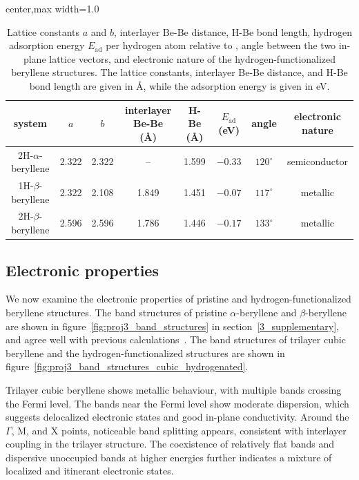 \begin{table}[!htbp]
\centering
{}
\begin{adjustbox}{center,max width=1.0\linewidth}
\begin{tabular}{cccccccc}
\hline
\rowcolor{gray!25}
system
& $a$
& $b$
& interlayer Be-Be (\AA)
& H-Be (\AA)
& $E_{\mathrm{ad}}$ (eV)
& angle
& electronic nature \\
\hline
2H-$\alpha$-beryllene
& 2.322 & 2.322 & -- & 1.599 & $-0.33$ & $120^{\circ}$ & semiconductor \\
1H-$\beta$-beryllene
& 2.322 & 2.108 & 1.849 & 1.451 & $-0.07$ & $117^{\circ}$ & metallic \\
2H-$\beta$-beryllene
& 2.596 & 2.596 & 1.786 & 1.446 & $-0.17$ & $133^{\circ}$ & metallic \\
\hline
\end{tabular}
\end{adjustbox}
\caption{Lattice constants $a$ and $b$,
interlayer Be-Be distance, H-Be bond length,
hydrogen adsorption energy $E_{\mathrm{ad}}$ per hydrogen atom relative to ,
angle between the two in-plane lattice vectors,
and electronic nature of the hydrogen-functionalized beryllene structures.
The lattice constants, interlayer Be-Be distance,
and H-Be bond length are given in \si{\angstrom},
while the adsorption energy is given in \si{\electronvolt}.}
\label{tab:proj3_hydrogenated_structural_parameters}
\end{table}

\subsection{Electronic properties}
\label{3_electronic_properties}

We now examine the electronic properties of pristine and hydrogen-functionalized beryllene structures.
The band structures of pristine $\alpha$-beryllene and $\beta$-beryllene are shown in figure~\ref{fig:proj3_band_structures} in section~\ref{3_supplementary},
and agree well with previous calculations~\cite{li2023coexistence}.
The band structures of trilayer cubic beryllene and the hydrogen-functionalized structures are shown in figure~\ref{fig:proj3_band_structures_cubic_hydrogenated}.

Trilayer cubic beryllene shows metallic behaviour,
with multiple bands crossing the Fermi level.
The bands near the Fermi level show moderate dispersion,
which suggests delocalized electronic states and good in-plane conductivity.
Around the $\Gamma$,
$\mathrm{M}$,
and $\mathrm{X}$ points,
noticeable band splitting appears,
consistent with interlayer coupling in the trilayer structure.
The coexistence of relatively flat bands and dispersive unoccupied bands at higher energies further indicates a mixture of localized and itinerant electronic states.

